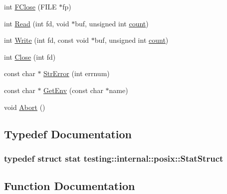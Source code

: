 \begin{DoxyCompactItemize}
\item 
int \hyperlink{namespacetesting_1_1internal_1_1posix_af4beeaaa8d62916d5e3b644a1ddfbd6b}{F\+Close} (F\+I\+LE $\ast$fp)
\item 
int \hyperlink{namespacetesting_1_1internal_1_1posix_a3c6ab13e581a56f1b02f3eb7536c97fd}{Read} (int fd, void $\ast$buf, unsigned int \hyperlink{gmock__stress__test_8cc_afd9db40e3361ae09188795e8cbe19752}{count})
\item 
int \hyperlink{namespacetesting_1_1internal_1_1posix_af4acf9f78d55f815a18b43786511abef}{Write} (int fd, const void $\ast$buf, unsigned int \hyperlink{gmock__stress__test_8cc_afd9db40e3361ae09188795e8cbe19752}{count})
\item 
int \hyperlink{namespacetesting_1_1internal_1_1posix_a15e5b8f2a535ef1b2529b85b861e4846}{Close} (int fd)
\item 
const char $\ast$ \hyperlink{namespacetesting_1_1internal_1_1posix_a4b77b14af6f4d18f83d303b98e9349c4}{Str\+Error} (int errnum)
\item 
const char $\ast$ \hyperlink{namespacetesting_1_1internal_1_1posix_a1d5e3da5a27eed25986859fa83cafe95}{Get\+Env} (const char $\ast$name)
\item 
void \hyperlink{namespacetesting_1_1internal_1_1posix_a69b8278c59359dd6a6f941b4643db9fb}{Abort} ()
\end{DoxyCompactItemize}


\subsection{Typedef Documentation}
\subsubsection[{\texorpdfstring{Stat\+Struct}{StatStruct}}]{\setlength{\rightskip}{0pt plus 5cm}typedef struct stat {\bf testing\+::internal\+::posix\+::\+Stat\+Struct}}\hypertarget{namespacetesting_1_1internal_1_1posix_a8eb9f08d3af29941c2d2a964cfff3ecb}{}\label{namespacetesting_1_1internal_1_1posix_a8eb9f08d3af29941c2d2a964cfff3ecb}


\subsection{Function Documentation}
